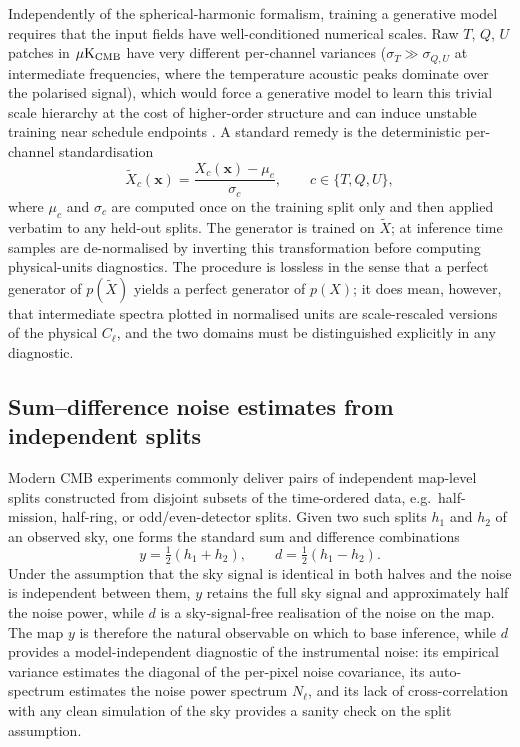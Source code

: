 \documentclass[11pt]{article}
\theoremstyle{definition}
\begin{document}
Independently of the spherical-harmonic formalism, training a generative model requires that the input fields have well-conditioned numerical scales. Raw $T$, $Q$, $U$ patches in $\mu\mathrm{K}_{\rm CMB}$ have very different per-channel variances ($\sigma_T \gg \sigma_{Q,U}$ at intermediate frequencies, where the temperature acoustic peaks dominate over the polarised signal), which would force a generative model to learn this trivial scale hierarchy at the cost of higher-order structure and can induce unstable training near schedule endpoints \cite{ho2020ddpm,heurtel2023dust}. A standard remedy is the deterministic per-channel standardisation
\begin{equation}
  \tilde X_c(\bm{x}) = \frac{X_c(\bm{x})-\mu_c}{\sigma_c},
  \qquad
  c\in\{T,Q,U\},
\end{equation}
where $\mu_c$ and $\sigma_c$ are computed once on the training split only and then applied verbatim to any held-out splits. The generator is trained on $\tilde X$; at inference time samples are de-normalised by inverting this transformation before computing physical-units diagnostics. The procedure is lossless in the sense that a perfect generator of $p(\tilde X)$ yields a perfect generator of $p(X)$; it does mean, however, that intermediate spectra plotted in normalised units are scale-rescaled versions of the physical $C_\ell$, and the two domains must be distinguished explicitly in any diagnostic.

\subsection{Sum--difference noise estimates from independent splits}
\label{sec:halfring}

Modern CMB experiments commonly deliver pairs of independent map-level splits constructed from disjoint subsets of the time-ordered data, e.g.\ half-mission, half-ring, or odd/even-detector splits. Given two such splits $h_1$ and $h_2$ of an observed sky, one forms the standard sum and difference combinations
\begin{equation}
  y = \tfrac{1}{2}(h_1 + h_2),
  \qquad
  d = \tfrac{1}{2}(h_1 - h_2).
\end{equation}
Under the assumption that the sky signal is identical in both halves and the noise is independent between them, $y$ retains the full sky signal and approximately half the noise power, while $d$ is a sky-signal-free realisation of the noise on the map. The map $y$ is therefore the natural observable on which to base inference, while $d$ provides a model-independent diagnostic of the instrumental noise: its empirical variance estimates the diagonal of the per-pixel noise covariance, its auto-spectrum estimates the noise power spectrum $N_\ell$, and its lack of cross-correlation with any clean simulation of the sky provides a sanity check on the split assumption.
\end{document}
